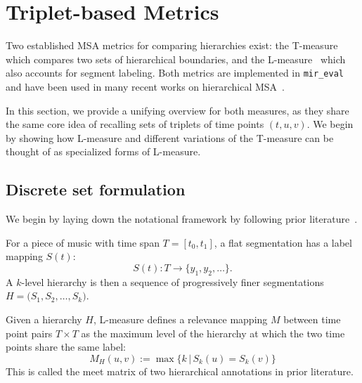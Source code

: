 
\section{Triplet-based Metrics}\label{sec:hierarchy_metrics}
Two established MSA metrics for comparing hierarchies exist: the T-measure~\cite{DBLP:conf/ismir/McFeeNB15} which compares two sets of hierarchical boundaries, and the L-measure~\cite{McfeeNFB17} which also accounts for segment labeling.
Both metrics are implemented in \texttt{mir\_eval}~\cite{DBLP:conf/ismir/RaffelMHSNLE14} and have been used in many recent works on hierarchical MSA~\cite{DBLP:journals/taslp/BuissonMEC24, DBLP:conf/icassp/TralieM19, DBLP:journals/tismir/BerardinisVCC20, DBLP:conf/apsipa/ChenSY23}.

In this section, we provide a unifying overview for both measures, as they share the same core idea of recalling sets of triplets of time points $(t,u,v)$.
We begin by showing how L-measure and different variations of the T-measure can be thought of as specialized forms of L-measure.

\subsection{Discrete set formulation}
We begin by laying down the notational framework by following prior literature~\cite{DBLP:journals/tismir/NietoMWSSGM20,DBLP:journals/tismir/KinnairdM21}.

For a piece of music with time span \(T = [t_0, t_1]\), a flat segmentation has a label mapping $S(t)$:
\begin{equation}
    S(t): T \to \{y_1, y_2, \ldots\}.
    \label{eq:S}
\end{equation}
A $k$-level hierarchy is then a sequence of progressively finer segmentations
\(H = \bigl(S_{1}, S_{2}, \dots, S_k\bigr)\).

Given a hierarchy $H$, L-measure defines a relevance mapping $M$ between time point pairs $T \times T$ as the maximum level of the hierarchy at which the two time points share the same label:
\begin{equation}
    M_H(u, v) := \max \big\{k \, | \, S_k(u) = S_k(v)\big\}
    \label{eq:relevance_mapping}
\end{equation}
This is called the meet matrix of two hierarchical annotations in prior literature.

